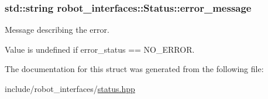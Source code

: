 \subsubsection[{\texorpdfstring{error\+\_\+message}{error_message}}]{\setlength{\rightskip}{0pt plus 5cm}std\+::string robot\+\_\+interfaces\+::\+Status\+::error\+\_\+message}\hypertarget{structrobot__interfaces_1_1Status_a7da10fb73cd19f2840c438d321eac744}{}\label{structrobot__interfaces_1_1Status_a7da10fb73cd19f2840c438d321eac744}


Message describing the error. 

Value is undefined if {\ttfamily error\+\_\+status == N\+O\+\_\+\+E\+R\+R\+OR}. 

The documentation for this struct was generated from the following file\+:\begin{DoxyCompactItemize}
\item 
include/robot\+\_\+interfaces/\hyperlink{status_8hpp}{status.\+hpp}\end{DoxyCompactItemize}
